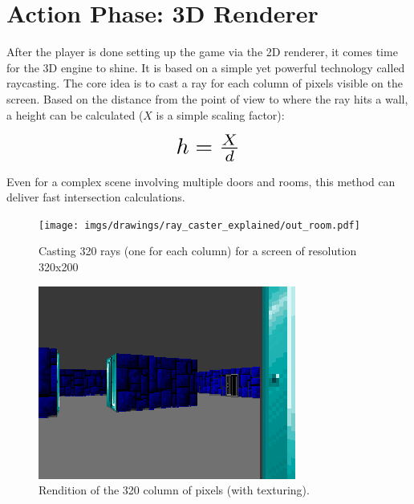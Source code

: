 \section{Action Phase: 3D Renderer}
After the player is done setting up the game via the 2D renderer, it comes time for the 3D engine to shine. It is based on a simple yet powerful technology called raycasting. The core idea is to cast a ray for each column of pixels visible on the screen. Based on the distance  from the point of view to where the ray hits a wall, a height  can be calculated ($X$ is a simple scaling factor):\\
\par
\begin{figure}[H]
  \centering
  \begin{equation*}
      \scalebox{2.0}{$h = \frac{X}{d}$} 
  \end{equation*}
\end{figure}
\par
Even for a complex scene involving multiple doors and rooms, this method can deliver fast intersection calculations.
\par
\begin{figure}[H]
\centering
 \texttt{[image: imgs/drawings/ray\_caster\_explained/out\_room.pdf]}
 \caption{Casting 320 rays (one for each column) for a screen of resolution 320x200} \label{fig:Raycasting2}
\end{figure}

\begin{figure}[H]
  \centering
 \includegraphics[width=\textwidth]{imgs/drawings/ray_caster_explained/out_door.png}
 \caption{Rendition of the 320 column of pixels (with texturing).} 
\end{figure} 















